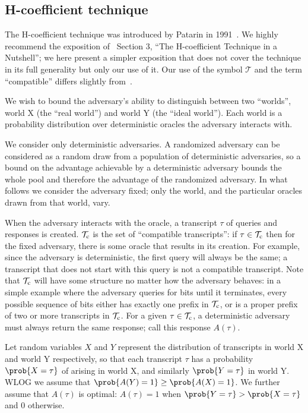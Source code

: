 \documentclass[hctr.tex]{subfiles}
\begin{document}
\subsection{H-coefficient technique}
The H-coefficient technique was introduced by Patarin in 1991~\cite{ppdes,hco}.
We highly recommend the exposition
of~\cite{hco2} Section 3,
``The H-coefficient Technique in a Nutshell'';
we here present a simpler exposition that
does not cover the technique in its full
generality but only our use of it.
Our use of the symbol \(\mathcal{T}\) and the term
``compatible'' differs slightly from~\cite{hco2}.

We wish to bound the adversary's ability to distinguish between
two ``worlds'', world X (the ``real world'') and world Y (the ``ideal world'').
Each world is a probability distribution over
deterministic oracles the adversary interacts with.

We consider only deterministic adversaries.
A randomized adversary can be considered as a random draw
from a population of deterministic adversaries, so
a bound on the advantage achievable by a deterministic
adversary bounds the whole pool and therefore
the advantage of the randomized adversary. In what follows
we consider the adversary fixed; only the world, and the
particular oracles drawn from that world, vary.

When the adversary interacts with the oracle,
a transcript \(\tau\) of queries and responses is created.
\(\mathcal{T}_\mathrm{c}\) is the set of ``compatible transcripts'':
if \(\tau \in \mathcal{T}_\mathrm{c}\) then for the fixed adversary,
there is some oracle
that results in its creation. For example,
since the adversary is deterministic, the first query
will always be the same; a transcript that
does not start with this query is not a compatible transcript.
Note that \(\mathcal{T}_\mathrm{c}\) will have some structure
no matter how the adversary behaves:
in a simple example where the adversary
queries for bits until it terminates,
every possible sequence of bits 
either has exactly one prefix in \(\mathcal{T}_\mathrm{c}\),
or is a proper prefix of two or more transcripts in \(\mathcal{T}_\mathrm{c}\).
For a given \(\tau \in \mathcal{T}_\mathrm{c}\),
a deterministic adversary must always
return the same response; call this response \(A(\tau)\).

Let random variables \(X\) and \(Y\)
represent the distribution of transcripts
in world X and world Y respectively, so that
each transcript \(\tau\) has a probability \(\prob{X = \tau}\)
of arising in world X, and similarly \(\prob{Y = \tau}\) in world Y.
WLOG we assume that \(\prob{A(Y) = 1} \geq \prob{A(X) = 1}\).
We further assume that \(A(\tau)\) is optimal:
\(A(\tau) = 1\)
when \(\prob{Y = \tau} > \prob{X = \tau}\) and 0 otherwise.
\end{document}
